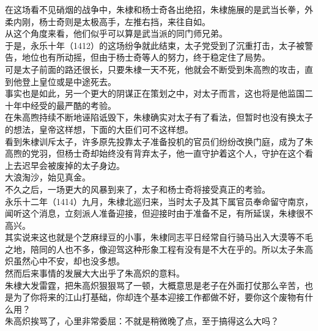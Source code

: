 \begin{multicols}{\theparacolNo}
在这场看不见硝烟的战争中，朱棣和杨士奇各出绝招，朱棣施展的是武当长拳，外柔内刚，杨士奇则是太极高手，左推右挡，来往自如。\\

从这个角度来看，他们似乎可以算是武当派的同门师兄弟。\\

于是，永乐十年（1412）的这场纷争就此结束，太子党受到了沉重打击，太子被警告，地位也有所动摇，但由于杨士奇等人的努力，终于稳定住了局势。\\

可是太子前面的路还很长，只要朱棣一天不死，他就会不断受到朱高煦的攻击，直到他登上皇位或是中途死去。\\

事实也是如此，另一个更大的阴谋正在策划之中，对太子而言，这也将是他监国二十年中经受的最严酷的考验。\\

在朱高煦持续不断地诬陷诋毁下，朱棣确实对太子有了看法，但暂时也没有换太子的想法，皇帝这样想，下面的大臣们可不这样想。\\

看到朱棣训斥太子，许多原先投靠太子准备投机的官员们纷纷改换门庭，成为了朱高煦的党羽，但杨士奇却始终没有背弃太子，他一直守护着这个人，守护在这个看上去迟早会被废掉的太子身边。\\

大浪淘沙，始见真金。\\

不久之后，一场更大的风暴到来了，太子和杨士奇将接受真正的考验。\\

永乐十二年（1414）九月，朱棣北巡归来，当时太子及其下属官员奉命留守南京，闻听这个消息，立刻派人准备迎接，但迎接时由于准备不足，有所延误，朱棣很不高兴。\\

其实说来这也就是个芝麻绿豆的小事，朱棣同志平日经常自行骑马出入大漠等不毛之地，陪同的人也不多，像迎驾这种形象工程有没有是不大在乎的。所以太子朱高炽虽然心中不安，却也没多想。\\

然而后来事情的发展大大出乎了朱高炽的意料。\\

朱棣大发雷霆，把朱高炽狠狠骂了一顿，大概意思是老子在外面打仗那么辛苦，也是为了你将来的江山打基础，你却连个基本迎接工作都做不好，要你这个废物有什么用？\\

朱高炽挨骂了，心里非常委屈：不就是稍微晚了点，至于搞得这么大吗？\\


\end{multicols}
